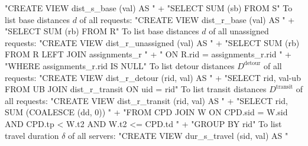 "CREATE VIEW dist_s_base (val) AS "
  + "SELECT SUM (sb) FROM S"
\nwendcode{}\nwdocspar
To list base distances $d$ of all requests:
\nwenddocs{}\endmoddef{}
"CREATE VIEW dist_r_base (val) AS "
  + "SELECT SUM (rb) FROM R"
\nwendcode{}\nwdocspar
To list base distances $d$ of all unassigned requests:
\nwenddocs{}\endmoddef{}
"CREATE VIEW dist_r_unassigned (val) AS "
  + "SELECT SUM (rb) FROM R LEFT JOIN assignments_r "
  + "  ON R.rid = assignments_r.rid "
  + "WHERE assignments_r.rid IS NULL"
\nwendcode{}\nwdocspar
To list detour distances $D^\textrm{detour}$ of all requests:
\nwenddocs{}\endmoddef{}
"CREATE VIEW dist_r_detour (rid, val) AS "
  + "SELECT rid, val-ub FROM UB JOIN dist_r_transit ON uid = rid"
\nwendcode{}\nwdocspar
To list transit distances $D^\textrm{transit}$ of all requests:
\nwenddocs{}\endmoddef{}
"CREATE VIEW dist_r_transit (rid, val) AS "
  + "SELECT rid, SUM (COALESCE (dd, 0)) "
  + "FROM CPD JOIN W ON CPD.sid = W.sid AND CPD.tp < W.t2 AND W.t2 <= CPD.td "
  + "GROUP BY rid"
\nwendcode{}\nwdocspar
To list travel duration $\delta$ of all servers:
\nwenddocs{}\endmoddef{}
"CREATE VIEW dur_s_travel (sid, val) AS "
